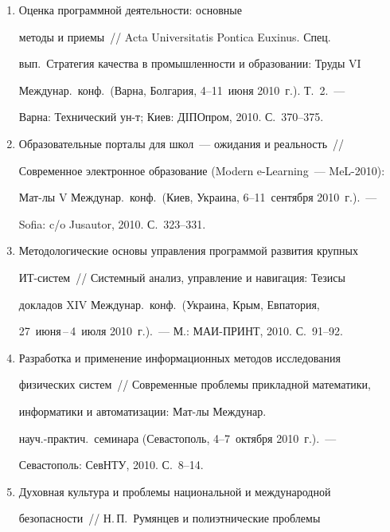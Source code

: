   \begin{enumerate}[1.]


\item {} Оценка программной деятельности: основные 


методы и приемы~/\!\!/  Acta Universitatis Pontica Euxinus. Спец. 


вып.~Стратегия качества в промышленности и образовании: Труды VI 


Междунар.\ конф.\ (Варна, Болгария, 4--11~июня 2010~г.). Т.~2.~--- 


Варна: Технический ун-т; Киев: ДIПОпром, 2010. С.~370--375.


\item {}


Образовательные порталы для школ~--- ожидания и реальность~/\!\!/  


Современное электронное образование (Modern e-Learning~--- MeL-2010): 


Мат-лы V Междунар.\ конф.\ (Киев, Украина, 6--11~сен\-тяб\-ря 2010~г.).~--- 


Sofia: c/o Jusautor, 2010. С.~323--331.


\item {}


Методологические основы управления программой развития крупных 


ИТ-сис\-тем~/\!\!/  Системный анализ, управление и навигация: Тезисы 


докладов XIV Междунар.\ конф.\ (Украина, Крым, Евпатория, 


27~июня\,--\,4~июля 2010~г.).~--- М.: МАИ-ПРИНТ, 2010. С.~91--92.


\item {}


Разработка и применение информационных методов исследования 


физических сис\-тем~/\!\!/  Современные проблемы прикладной математики, 


информатики и автоматизации: Мат-лы Междунар.\ 


науч.-практич.\ семинара (Севастополь, 4--7~октября 2010~г.).~--- 


Севастополь: СевНТУ, 2010. С.~8--14.


\item {}


Духовная культура и проблемы национальной и международной 


безопасности~/\!\!/  Н.\,П.~Румянцев и полиэтнические проблемы 



\end{enumerate}
